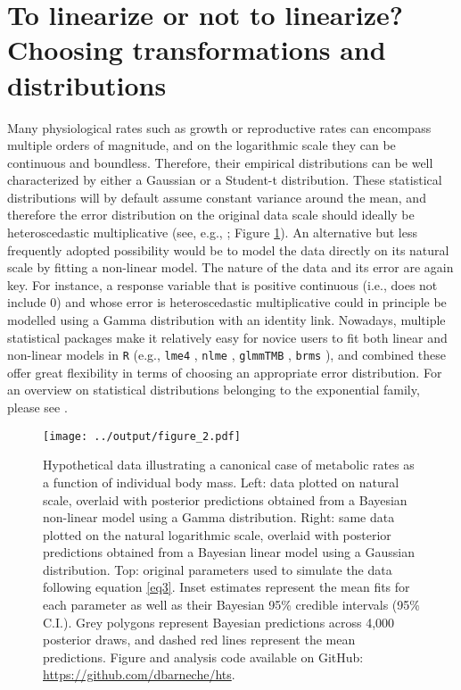 \documentclass[a4paper,12pt]{article}
\begin{document}
\bigskip
\bigskip

\section{To linearize or not to linearize? Choosing transformations and distributions}
\label{distributions}

Many physiological rates such as growth or reproductive rates can encompass multiple orders of magnitude, and on the logarithmic scale they can be continuous and boundless. Therefore, their empirical distributions can be well characterized by either a Gaussian or a Student-t distribution. These statistical distributions will by default assume constant variance around the mean, and therefore the error distribution on the original data scale should ideally be heteroscedastic multiplicative (see, e.g., \cite{xiao2011ecology}; Figure \ref{fig2}). An alternative but less frequently adopted possibility would be to model the data directly on its natural scale by fitting a non-linear model. The nature of the data and its error are again key. For instance, a response variable that is positive continuous (i.e., does not include 0) and whose error is heteroscedastic multiplicative could in principle be modelled using a Gamma distribution with an identity link. Nowadays, multiple statistical packages make it relatively easy for novice users to fit both linear and non-linear models in \texttt{R} \cite{Rcitation} (e.g., \texttt{lme4} \cite{lme4}, \texttt{nlme} \cite{nlme}, \texttt{glmmTMB} \cite{glmmTMB}, \texttt{brms} \cite{brms}), and combined these offer great flexibility in terms of choosing an appropriate error distribution. For an overview on statistical distributions belonging to the exponential family, please see \cite{zuur2009book}.

\bigskip
\bigskip

\begin{figure}[h!]
  \begin{center}
    \texttt{[image: ../output/figure\_2.pdf]}
  \end{center}
  \caption{Hypothetical data illustrating a canonical case of metabolic rates as a function of individual body mass. Left: data plotted on natural scale, overlaid with posterior predictions obtained from a Bayesian non-linear model using a Gamma distribution. Right: same data plotted on the natural logarithmic scale, overlaid with posterior predictions obtained from a Bayesian linear model using a Gaussian distribution. Top: original parameters used to simulate the data following equation \ref{eq3}. Inset estimates represent the mean fits for each parameter as well as their Bayesian 95\% credible intervals (95\% C.I.). Grey polygons represent Bayesian predictions across 4,000 posterior draws, and dashed red lines represent the mean predictions. Figure and analysis code available on GitHub: \url{https://github.com/dbarneche/hts}.}
  \label{fig2}
\end{figure}
\end{document}
